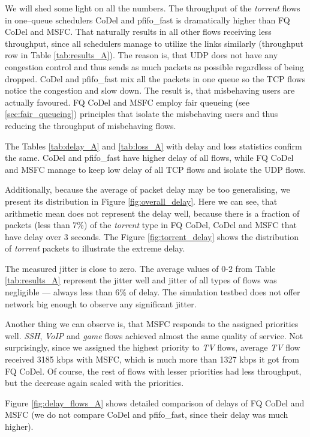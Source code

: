 We will shed some light on all the numbers. The throughput of the \emph{torrent} flows in one--queue schedulers CoDel and pfifo\_fast is dramatically higher than FQ CoDel and MSFC. That naturally results in all other flows receiving less throughput, since all schedulers manage to utilize the links similarly (throughput row in Table \ref{tab:results_A}). The reason is, that UDP does not have any congestion control and thus sends as much packets as possible regardless of being dropped. CoDel and pfifo\_fast mix all the packets in one queue so the TCP flows notice the congestion and slow down. The result is, that misbehaving users are actually favoured. FQ CoDel and MSFC employ fair queueing (see \autoref{sec:fair_queueing}) principles that isolate the misbehaving users and thus reducing the throughput of misbehaving flows.

The Tables \ref{tab:delay_A} and \ref{tab:loss_A} with delay and loss statistics confirm the same. CoDel and pfifo\_fast have higher delay of all flows, while FQ CoDel and MSFC manage to keep low delay of all TCP flows and isolate the UDP flows. 

Additionally, because the average of packet delay may be too generalising, we present its distribution in Figure \ref{fig:overall_delay}. Here we can see, that arithmetic mean does not represent the delay well, because there is a fraction of packets (less than 7\%) of the \emph{torrent} type in FQ CoDel, CoDel and MSFC that have delay over 3 seconds. The Figure \ref{fig:torrent_delay} shows the distribution of \emph{torrent} packets to illustrate the extreme delay.

The measured jitter is close to zero. The average values of 0-2 from Table \ref{tab:results_A} represent the jitter well and jitter of all types of flows was negligible --- always less than 6\% of delay. The simulation testbed does not offer network big enough to observe any significant jitter. 

Another thing we can observe is, that MSFC responds to the assigned priorities well. \emph{SSH}, \emph{VoIP} and \emph{game} flows achieved almost the same quality of service. Not surprisingly, since we assigned the highest priority to \emph{TV} flows, average \emph{TV} flow received 3185 kbps with MSFC, which is much more than 1327 kbps it got from FQ CoDel. Of course, the rest of flows with lesser priorities had less throughput, but the decrease again scaled with the priorities.

Figure \ref{fig:delay_flows_A} shows detailed comparison of delays of FQ CoDel and MSFC (we do not compare CoDel and pfifo\_fast, since their delay was much higher).


